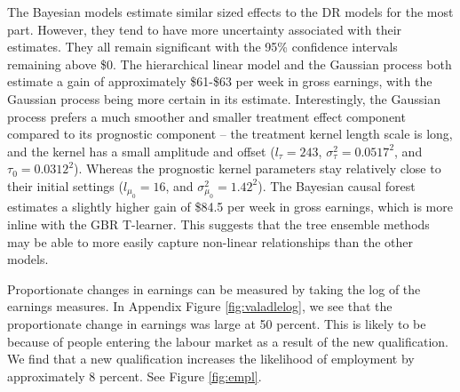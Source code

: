 \documentclass[12pt, a4paper]{article}
\begin{document}
The Bayesian models estimate similar sized effects to the DR models for the
most part. However, they tend to have more uncertainty associated with their
estimates. They all remain significant with the 95\% confidence intervals
remaining above \$0. The hierarchical linear model and the Gaussian process
both estimate a gain of approximately \$61-\$63 per week in gross earnings,
with the Gaussian process being more certain in its estimate. Interestingly,
the Gaussian process prefers a much smoother and smaller treatment effect
component compared to its prognostic component -- the treatment kernel length
scale is long, and the kernel has a small amplitude and offset ($l_\tau = 243$,
$\sigma_\tau^2 = 0.0517^2$, and $\tau_0 = 0.0312^2$). Whereas the prognostic
kernel parameters stay relatively close to their initial settings ($l_{\mu_0} =
16$, and $\sigma^2_{\mu_0} = 1.42^2$). The Bayesian causal forest estimates a
slightly higher gain of \$84.5 per week in gross earnings, which is more inline
with the GBR T-learner. This suggests that the tree ensemble methods may be
able to more easily capture non-linear relationships than the other models.

%

Proportionate changes in earnings can be measured by taking the log of the earnings measures. In Appendix Figure \ref{fig:valadlelog}, we see that the proportionate change in earnings was large at 50 percent. This is likely to be because of people entering the labour market as a result of the new qualification. We find that a new qualification increases the likelihood of employment by approximately 8 percent. See Figure \ref{fig:empl}.
\end{document}
